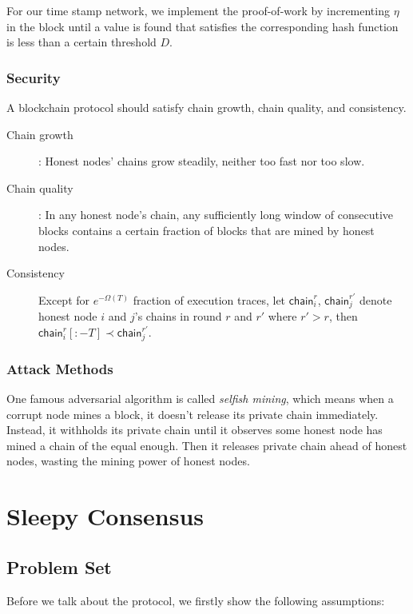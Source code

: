\documentclass[
10pt, %
a4paper, %
oneside, %
headinclude,footinclude, %
BCOR5mm, %
]{scrartcl}
\begin{document}
For our time stamp network, we implement the proof-of-work by incrementing $\eta$ in the block until a value is found that satisfies the corresponding hash function is less than a certain threshold $D$. 

\subsubsection{Security}
A blockchain protocol should satisfy chain growth, chain quality, and consistency. 

\begin{description}
\item[Chain growth]: Honest nodes' chains grow steadily, neither too fast nor too slow.

\item[Chain quality]: In any honest node's chain, any sufficiently long window of consecutive blocks contains a certain fraction of blocks that are mined by honest nodes.

\item[Consistency]
Except for $e^{-\Omega(T)}$ fraction of execution traces, let $\mathsf{chain}_i^r$, $\mathsf{chain}_j^{r'}$ denote honest node $i$ and $j$'s chains in round $r$ and $r'$ where $r'>r$, then $\mathsf{chain}_i^r[:-T] \prec \mathsf{chain}_j^{r'}$.

\end{description}

\subsubsection{Attack Methods}
    One famous adversarial algorithm is called \textit{selfish mining}, which means when a corrupt node mines a block, it doesn't release its private chain immediately. Instead, it withholds its private chain until it observes some honest node has mined a chain of the equal enough. Then it releases private chain ahead of honest nodes, wasting the mining power of honest nodes. 

\section{Sleepy Consensus}
\subsection{Problem Set}
Before we talk about the protocol, we firstly show the following assumptions:
\end{document}
